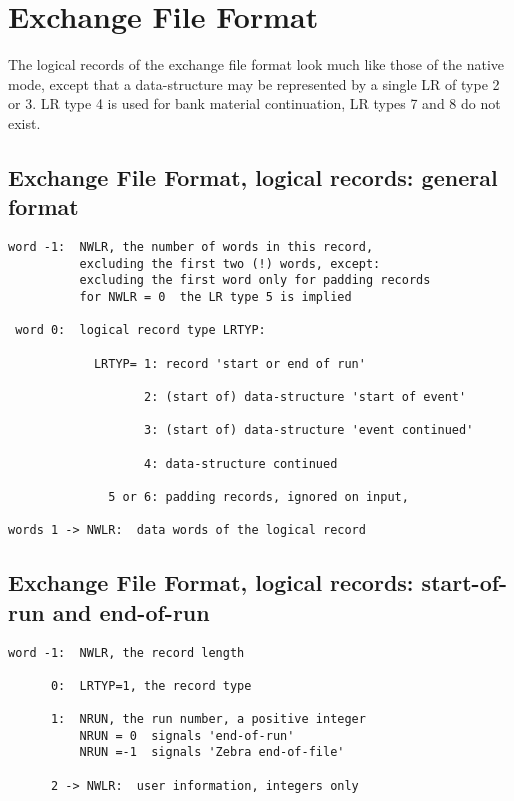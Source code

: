 \section{Exchange File Format}

The logical records of the exchange file format look much like those
of the native mode,
except that a data-structure may be represented by a single LR
of type 2 or 3.
LR type 4 is used for bank material continuation,
LR types 7 and 8 do not exist.

\subsection*{Exchange File Format, logical records: general format}

\begin{verbatim}
word -1:  NWLR, the number of words in this record,
          excluding the first two (!) words, except:
          excluding the first word only for padding records
          for NWLR = 0  the LR type 5 is implied

 word 0:  logical record type LRTYP:

            LRTYP= 1: record 'start or end of run'

                   2: (start of) data-structure 'start of event'

                   3: (start of) data-structure 'event continued'

                   4: data-structure continued

              5 or 6: padding records, ignored on input,

words 1 -> NWLR:  data words of the logical record
\end{verbatim}

\subsection*{Exchange File Format, logical records: start-of-run and end-of-run}

\begin{verbatim}
word -1:  NWLR, the record length

      0:  LRTYP=1, the record type

      1:  NRUN, the run number, a positive integer
          NRUN = 0  signals 'end-of-run'
          NRUN =-1  signals 'Zebra end-of-file'

      2 -> NWLR:  user information, integers only
\end{verbatim}

